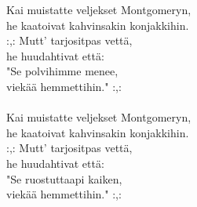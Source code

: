 
Kai muistatte veljekset Montgomeryn, \\ he kaatoivat kahvinsakin konjakkihin. \\ :,: Mutt' tarjositpas vettä, \\ he huudahtivat että: \\ "Se polvihimme menee, \\ viekää hemmettihin." :,: \\ \hspace{10mm} \\ Kai muistatte veljekset Montgomeryn, \\ he kaatoivat kahvinsakin konjakkihin. \\ :,: Mutt' tarjositpas vettä, \\ he huudahtivat että: \\ "Se ruostuttaapi kaiken, \\ viekää hemmettihin." :,:
